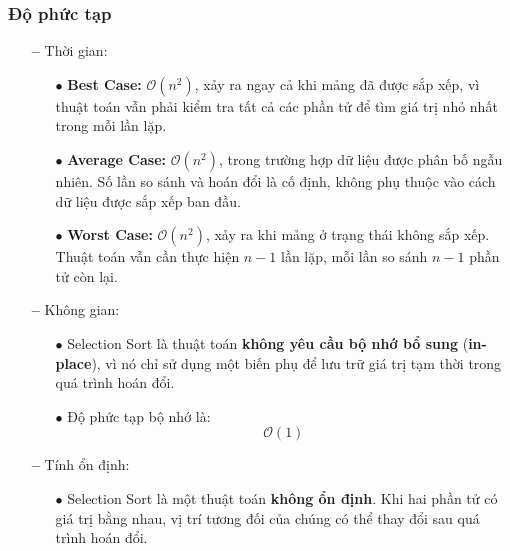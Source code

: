 \subsubsection{{Độ phức tạp}}
\begin{itemize}
    \item[\textbf{--}] {Thời gian:}
    \begin{itemize}
        \item[$\bullet$] \textbf{Best Case:} \(\mathcal{O}(n^2)\), xảy ra ngay cả khi mảng đã được sắp xếp, vì thuật toán vẫn phải kiểm tra tất cả các phần tử để tìm giá trị nhỏ nhất trong mỗi lần lặp.
        \item[$\bullet$] \textbf{Average Case:} \(\mathcal{O}(n^2)\), trong trường hợp dữ liệu được phân bố ngẫu nhiên. Số lần so sánh và hoán đổi là cố định, không phụ thuộc vào cách dữ liệu được sắp xếp ban đầu.
        \item[$\bullet$] \textbf{Worst Case:} \(\mathcal{O}(n^2)\), xảy ra khi mảng ở trạng thái không sắp xếp. Thuật toán vẫn cần thực hiện \(n-1\) lần lặp, mỗi lần so sánh \(n-1\) phần tử còn lại.
    \end{itemize}
    \item[\textbf{--}] {Không gian:}
    \begin{itemize}
        \item[$\bullet$] Selection Sort là thuật toán \textbf{không yêu cầu bộ nhớ bổ sung} (\textbf{in-place}), vì nó chỉ sử dụng một biến phụ để lưu trữ giá trị tạm thời trong quá trình hoán đổi.
        \item[$\bullet$] Độ phức tạp bộ nhớ là:
        \[
        \mathcal{O}(1)
        \]
    \end{itemize}
    \item[\textbf{--}] {Tính ổn định:}
    \begin{itemize}
        \item[$\bullet$] Selection Sort là một thuật toán \textbf{không ổn định}. Khi hai phần tử có giá trị bằng nhau, vị trí tương đối của chúng có thể thay đổi sau quá trình hoán đổi.
    \end{itemize}
\end{itemize}